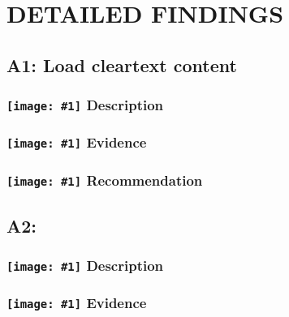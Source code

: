 \documentclass[12p]{article}
\newcommand{\icon}[1]{\texttt{[image: \#1]}}
\begin{document}
\section{DETAILED FINDINGS}
\subsection{A1: Load cleartext content}
\subsubsection*{\protect\icon{/home/miki/Documents/GITHUB/AndroidPermissions/python/vulns/report_icons/basic_sheet.png} Description}

\subsubsection*{\protect\icon{/home/miki/Documents/GITHUB/AndroidPermissions/python/vulns/report_icons/basic_magnifier.png} Evidence}

\subsubsection*{\protect\icon{/home/miki/Documents/GITHUB/AndroidPermissions/python/vulns/report_icons/basic_todo.png} Recommendation}

\subsection{A2: }
\subsubsection*{\protect\icon{/home/miki/Documents/GITHUB/AndroidPermissions/python/vulns/report_icons/basic_sheet.png} Description}

\subsubsection*{\protect\icon{/home/miki/Documents/GITHUB/AndroidPermissions/python/vulns/report_icons/basic_magnifier.png} Evidence}
\end{document}
